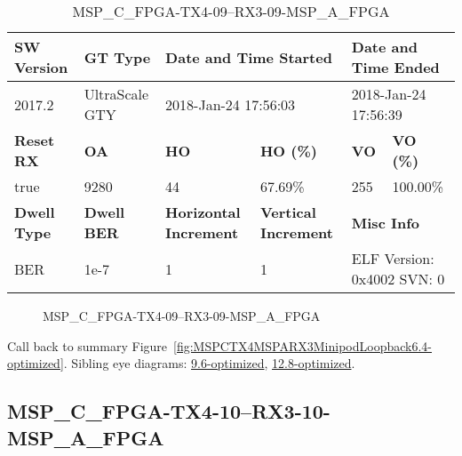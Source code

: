 \begin{table}[h]
\centering
\caption{MSP\_C\_FPGA-TX4-09--RX3-09-MSP\_A\_FPGA}
\label{tab:MSPCFPGATX409RX309MSPAFPGA6.4-optimized}
\begin{tabular}{@{}|l|l|l|l|l|l|@{}}
\toprule
\textbf{SW Version}                & \textbf{GT Type}   & \multicolumn{2}{l|}{\textbf{Date and Time Started}}            & \multicolumn{2}{l|}{\textbf{Date and Time Ended}}        \\ \midrule
2017.2                       & UltraScale GTY          & \multicolumn{2}{l|}{2018-Jan-24 17:56:03}                   & \multicolumn{2}{l|}{2018-Jan-24 17:56:39}               \\ \midrule
\textbf{Reset RX}                  & \textbf{OA} & \textbf{HO}   & \textbf{HO (\%)} & \textbf{VO} & \textbf{VO (\%)} \\ \midrule
true & 9280        & 44          & 67.69\%        & 255        & 100.00\%       \\ \midrule
\textbf{Dwell Type}                & \textbf{Dwell BER} & \textbf{Horizontal Increment} & \textbf{Vertical Increment}    & \multicolumn{2}{l|}{\textbf{Misc Info}}                  \\ \midrule
BER                            & 1e-7        & 1        & 1           & \multicolumn{2}{l|}{ELF Version: 0x4002 SVN: 0}                         \\ \bottomrule
\end{tabular}
\end{table}

\begin{figure}[h]
\caption{MSP\_C\_FPGA-TX4-09--RX3-09-MSP\_A\_FPGA} \label{fig:MSPCFPGATX409RX309MSPAFPGA6.4-optimized}
\end{figure}

Call back to summary Figure~\ref{fig:MSPCTX4MSPARX3MinipodLoopback6.4-optimized}.
Sibling eye diagrams: \hyperref[sec:MSPCFPGATX409RX309MSPAFPGA9.6-optimized]{9.6-optimized}, \hyperref[sec:MSPCFPGATX409RX309MSPAFPGA12.8-optimized]{12.8-optimized}.

\clearpage
\newpage


\subsection{MSP\_C\_FPGA-TX4-10--RX3-10-MSP\_A\_FPGA}\label{sec:MSPCFPGATX410RX310MSPAFPGA6.4-optimized}

